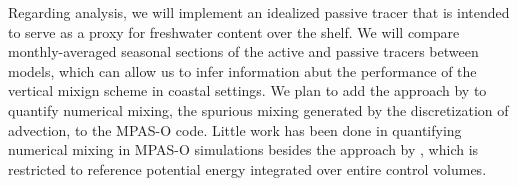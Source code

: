 Regarding analysis, we will implement an idealized passive tracer that is intended to serve as a proxy for freshwater content over the shelf. We will compare monthly-averaged seasonal sections of the active and passive tracers between models, which can allow us to infer information abut the performance of the vertical mixign scheme in coastal settings. We plan to add the approach by \cite{Klingbeil_2014} to quantify numerical mixing, the spurious mixing generated by the discretization of advection, to the MPAS-O code. Little work has been done in quantifying numerical mixing in MPAS-O simulations besides the approach by \cite{winters1995available}, which is restricted to reference potential energy integrated over entire control volumes.

